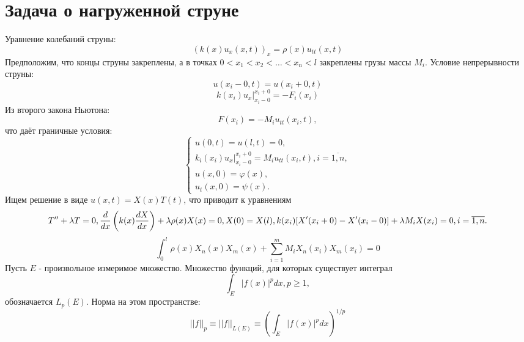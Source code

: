 \documentclass[11pt]{article}
\begin{document}
\section{Задача о нагруженной струне}
\label{sec:org6694a98}
Уравнение колебаний струны:
\begin{equation}
(k(x)u_x(x, t))_x = \rho(x)u_{tt}(x, t)
\end{equation}
Предположим, что концы струны закреплены, а в точках $0 < x_1 < x_2 < \ldots < x_n < l$
закреплены грузы массы $M_i$.
Условие непрерывности струны:
\begin{equation}
u(x_i - 0, t) = u(x_i + 0, t)
\end{equation}
\begin{equation}
k(x_i)u_x|^{x_i + 0}_{x_i - 0} = -F_i(x_i)
\end{equation}
Из второго закона Ньютона:
\begin{equation}
F(x_i) = -M_iu_{tt}(x_i, t),
\end{equation}
что даёт граничные условия:
\begin{equation}
\begin{cases}
u(0, t) = u(l, t) = 0, \\
k_i(x_i)u_x|^{x_i + 0}_{x_i - 0} = M_iu_{tt}(x_i, t), i = \overline{1, n}, \\
u(x, 0) = \varphi(x), \\
u_t(x, 0) = \psi(x).
\end{cases}
\end{equation}
Ищем решение в виде $u(x, t) = X(x)T(t)$, что приводит к уравнениям
\begin{equation}
T'' + \lambda T = 0, \\
\frac{d}{dx}\left(k(x)\frac{dX}{dx}\right) + \lambda\rho(x)X(x) = 0, \\
X(0) = X(l), \\
k(x_i)[X'(x_i + 0) - X'(x_i - 0)] + \lambda M_iX(x_i) = 0, i = \overline{1, n}.
\end{equation}
\begin{equation}
\int_0^l\rho(x)X_n(x)X_m(x) + \sum_{i = 1}^mM_iX_n(x_i)X_m(x_i) = 0
\end{equation}
Пусть $E$ - произвольное измеримое множество. Множество функций, для которых существует интеграл
\begin{equation}
\int_E|f(x)|^pdx, p \geq 1,
\end{equation}
обозначается $L_p(E)$. Норма на этом пространстве:
\begin{equation}
||f||_p \equiv ||f||_{L(E)} \equiv \left(\int_E|f(x)|^pdx\right)^{1/p}
\end{equation}
\end{document}
